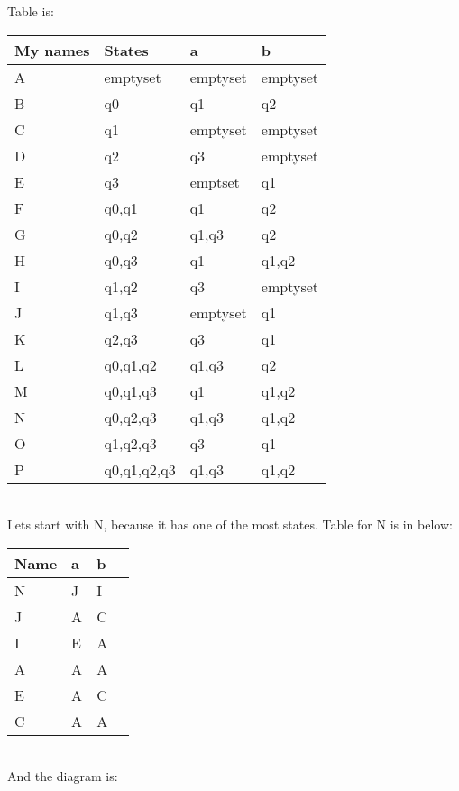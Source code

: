 \documentclass[12pt]{article}
\begin{document}
Table is:

\begin{tabular}{l|l|l|l}
My names & States      & a        & b        \\ \hline
A        & emptyset    & emptyset & emptyset \\
\hline
B        & q0          & q1       & q2       \\ \hline
C        & q1          & emptyset & emptyset \\ \hline
D        & q2          & q3       & emptyset \\ \hline
E        & q3          & emptset  & q1       \\ \hline
F        & q0,q1       & q1       & q2       \\ \hline
G        & q0,q2       & q1,q3    & q2       \\ \hline
H        & q0,q3       & q1       & q1,q2    \\ \hline
I        & q1,q2       & q3       & emptyset \\ \hline
J        & q1,q3       & emptyset & q1       \\ \hline
K        & q2,q3       & q3       & q1       \\ \hline
L        & q0,q1,q2    & q1,q3    & q2       \\ \hline
M        & q0,q1,q3    & q1       & q1,q2    \\ \hline
N        & q0,q2,q3    & q1,q3    & q1,q2    \\ \hline
O        & q1,q2,q3    & q3       & q1       \\ \hline
P        & q0,q1,q2,q3 & q1,q3    & q1,q2   
\end{tabular}
\\
Lets start with N, because it has one of the most states. Table for N is in below: \\

\begin{tabular}{l|l|l|l}
Name & a & b \\ \hline
N    & J & I \\ \hline
J    & A & C \\ \hline
I    & E & A \\ \hline
A    & A & A \\ \hline
E    & A & C \\ \hline
C    & A & A \\
\end{tabular}
\\
And the diagram is: \\
\end{document}
